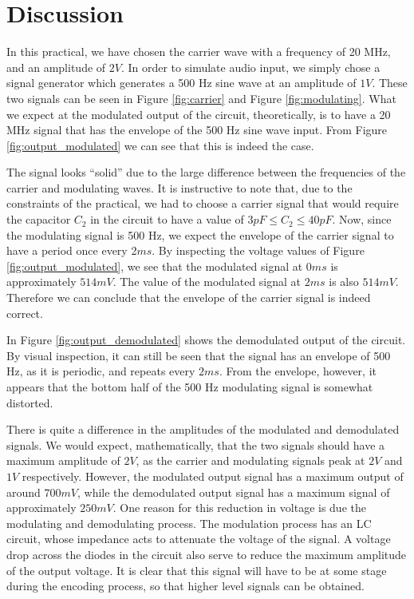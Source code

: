 \documentclass[12pt, a4paper]{article}
\begin{document}
\section{Discussion} %
\label{sec:discussion}
	In this practical, we have chosen the carrier wave with a frequency of 20 MHz, and an amplitude of $2V$. In order to simulate audio input, we simply chose a signal generator which generates a 500 Hz sine wave at an amplitude of $1V$. These two signals can be seen in Figure \ref{fig:carrier} and Figure \ref{fig:modulating}. What we expect at the modulated output of the circuit, theoretically, is to have a 20 MHz signal that has the envelope of the 500 Hz sine wave input. From Figure \ref{fig:output_modulated} we can see that this is indeed the case.

	The signal looks ``solid'' due to the large difference between the frequencies of the carrier and modulating waves. It is instructive to note that, due to the constraints of the practical, we had to choose a carrier signal that would require the capacitor $C_2$ in the circuit to have a value of $3pF \le C_2 \le 40pF$. Now, since the modulating signal is 500 Hz, we expect the envelope of the carrier signal to have a period once every 2$ms$. By inspecting the voltage values of Figure \ref{fig:output_modulated}, we see that the modulated signal at 0$ms$ is approximately $514mV$. The value of the modulated signal at $2ms$ is also $514mV$. Therefore we can conclude that the envelope of the carrier signal is indeed correct.

	In Figure \ref{fig:output_demodulated} shows the demodulated output of the circuit. By visual inspection, it can still be seen that the signal has an envelope of 500 Hz, as it is periodic, and repeats every $2ms$. From the envelope, however, it appears that the bottom half of the 500 Hz modulating signal is somewhat distorted.\linebreak

	There is quite a difference in the amplitudes of the modulated and demodulated signals. We would expect, mathematically, that the two signals should have a maximum amplitude of $2V$, as the carrier and modulating signals peak at $2V$ and $1V$ respectively. However, the modulated output signal has a maximum output of around $700mV$, while the demodulated output signal has a maximum signal of approximately $250mV$. One reason for this reduction in voltage is due the modulating and demodulating process. The modulation process has an LC circuit, whose impedance acts to attenuate the voltage of the signal. A voltage drop across the diodes in the circuit also serve to reduce the maximum amplitude of the output voltage. It is clear that this signal will have to be at some stage during the encoding process, so that higher level signals can be obtained.
\end{document}
